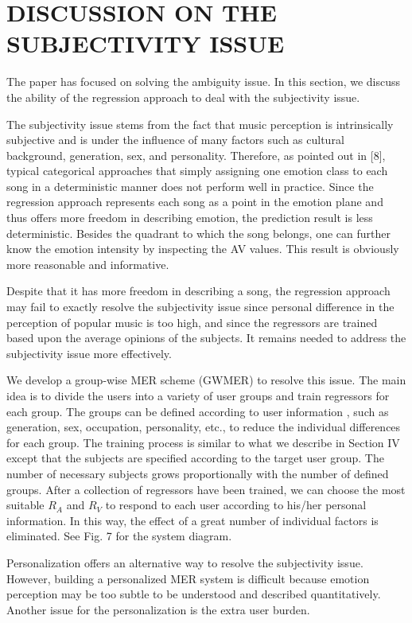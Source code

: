 \documentclass[journal, twoside]{IEEEtran}
\begin{document}
\section{DISCUSSION ON THE SUBJECTIVITY ISSUE}
The paper has focused on solving the ambiguity issue. In this
section, we discuss the ability of the regression approach to deal
with the subjectivity issue.

The subjectivity issue stems from the fact that music perception is intrinsically subjective and is under the influence of many factors such as cultural background, generation, sex, and personality. Therefore, as pointed out in [8], typical categorical approaches that simply assigning one emotion class to each song in a deterministic manner does not perform well in practice. Since the regression approach represents each song as a point in the emotion plane and thus offers more freedom in describing emotion, the prediction result is less deterministic. Besides the quadrant to which the song belongs, one can further know the
emotion intensity by inspecting the AV values. This result is obviously more reasonable and informative.

Despite that it has more freedom in describing a song, the regression approach may fail to exactly resolve the subjectivity issue since personal difference in the perception of popular music is too high, and since the regressors are trained based upon the average opinions of the subjects. It remains needed to address the subjectivity issue more effectively.

We develop a group-wise MER scheme (GWMER) to resolve this issue. The main idea is to divide the users into a variety of user groups and train regressors for each group. The groups can be defined according to user information \cite{34}, \cite{35} such as generation, sex, occupation, personality, etc., to reduce the individual differences for each group. The training process is similar to what we describe in Section IV except that the subjects are specified according to the target user group. The number of necessary subjects grows proportionally with the number of defined groups. After a collection of regressors have been trained, we can choose the most suitable $R_A$ and $R_V$ to respond to each user according to his/her personal information. In this way, the effect of a great number of individual factors is eliminated. See Fig. 7 for the system diagram.

Personalization offers an alternative way to resolve the subjectivity issue. However, building a personalized MER system is difficult because emotion perception may be too subtle to be understood and described quantitatively. Another issue for the personalization is the extra user burden.
\end{document}
